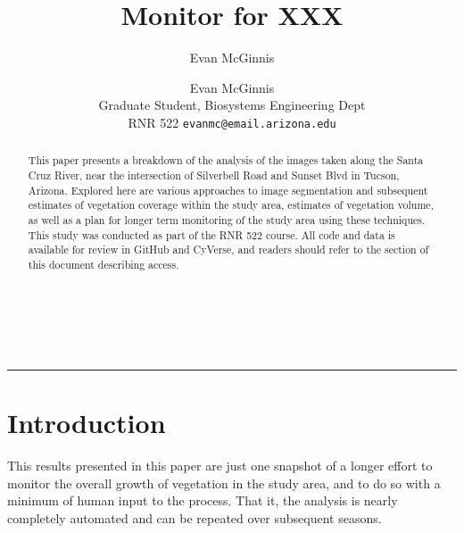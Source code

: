 \documentclass[letterpaper]{article}
\author{Evan McGinnis}
\title{Monitor for XXX}
\author{%
    Evan McGinnis \\
    Graduate Student, Biosystems Engineering Dept \\
    RNR 522
    \texttt{evanmc@email.arizona.edu}\vspace{40pt} \\
    }
\makeatletter
\def\printauthor{%
    {\large \@author}}
\makeatother
\begin{document}
\begin{titlepage}
\BgThispage
{}
\vspace*{1cm}
\noindent
\textcolor{white}{\Huge\textbf{\textsf{Application of Vegetation Indices\\2D and 3D data}}}
\vspace*{2.5cm}\par
\noindent
\begin{minipage}{0.35\linewidth}
    \begin{flushright}
        \printauthor
    \end{flushright}
\end{minipage} \hspace{15pt}
%
\begin{minipage}{0.02\linewidth}
    \rule{1pt}{175pt}
\end{minipage} \hspace{-10pt}
%
\begin{minipage}{0.6\linewidth}
\vspace{5pt}
    \begin{abstract} 
This paper presents a breakdown of the analysis of the images taken along the Santa Cruz River, near the intersection of Silverbell Road and Sunset Blvd in Tucson, Arizona. Explored here are various approaches to image segmentation and subsequent estimates of vegetation coverage within the study area, estimates of vegetation volume, as well as a plan for longer term monitoring of the study area using these techniques. This study was conducted as part of the RNR 522 course. All code and data is available for review in GitHub and CyVerse, and readers should refer to the section of this document describing access.
    \end{abstract}
\end{minipage}
\end{titlepage}
\restoregeometry
%
%
\section{Introduction}
This results presented in this paper are just one snapshot of a longer effort to monitor the overall growth of vegetation in the study area, and to do so with a minimum of human input to the process. That it, the analysis is nearly completely automated and can be repeated over subsequent seasons.

%
%
\end{document}
